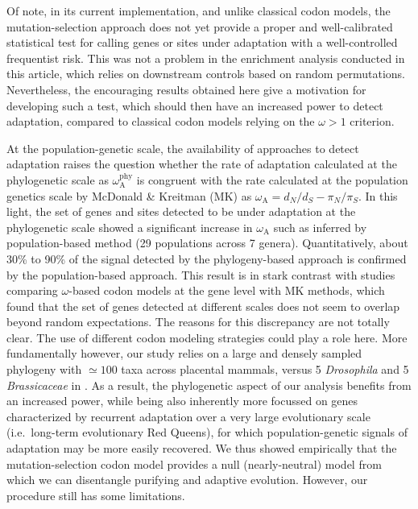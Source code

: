 \documentclass{article}
\newcommand{\dn}{d_N}
\newcommand{\ds}{d_S}
\newcommand{\dnds}{\dn / \ds}
\newcommand{\rateApop}{\omega_{\mathrm{A}}}
\newcommand{\rateAphy}{\rateApop^{\mathrm{phy}}}
\newcommand{\pn}{\pi_N}
\newcommand{\ps}{\pi_S}
\newcommand{\pnps}{\pn / \ps}
\begin{document}
    Of note, in its current implementation, and unlike classical codon models\cite{wong_accuracy_2004, yang_paml_2007}, the mutation-selection approach does not yet provide a proper and well-calibrated statistical test for calling genes or sites under adaptation with a well-controlled frequentist risk.
    This was not a problem in the enrichment analysis conducted in this article, which relies on downstream controls based on random permutations.
    Nevertheless, the encouraging results obtained here give a motivation for developing such a test, which should then have an increased power to detect adaptation, compared to classical codon models relying on the $\omega > 1$ criterion.

    At the population-genetic scale, the availability of approaches to detect adaptation\cite{mcdonald_adaptative_1991, messer_frequent_2013} raises the question whether the rate of adaptation calculated at the phylogenetic scale as $\rateAphy$ is congruent with the rate calculated at the population genetics scale by McDonald \& Kreitman (MK)\cite{mcdonald_adaptative_1991} as $\rateApop = \dnds - \pnps$.
    In this light, the set of genes and sites detected to be under adaptation at the phylogenetic scale showed a significant increase in $\rateApop$ such as inferred by population-based method (29 populations across 7 genera).
    Quantitatively, about 30\% to 90\% of the signal detected by the phylogeny-based approach is confirmed by the population-based approach.
    This result is in stark contrast with studies comparing $\omega$-based codon models at the gene level with MK methods, which found that the set of genes detected at different scales does not seem to overlap beyond random expectations\cite{chen_two_2021}.
    The reasons for this discrepancy are not totally clear.
    The use of different codon modeling strategies could play a role here.
    More fundamentally however, our study relies on a large and densely sampled phylogeny with $\simeq 100$ taxa across placental mammals, versus 5 \textit{Drosophila} and 5 \textit{Brassicaceae} in \textcite{chen_two_2021}.
    As a result, the phylogenetic aspect of our analysis benefits from an increased power, while being also inherently more focussed on genes characterized by recurrent adaptation over a very large evolutionary scale (i.e.~long-term evolutionary Red Queens), for which population-genetic signals of adaptation may be more easily recovered.
    We thus showed empirically that the mutation-selection codon model provides a null (nearly-neutral) model from which we can disentangle purifying and adaptive evolution.
    However, our procedure still has some limitations.
\end{document}
